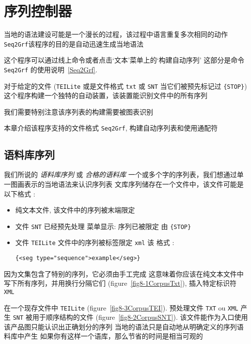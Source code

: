 \chapter{序列控制器}
\label{chap-sequence-automaton}

当地的语法建设可能是一个漫长的过程，该过程中语言重复多次相同的动作 \verb+Seq2Grf+该程序的目的是自动迅速生成当地语法

\bigskip
\noindent
这个程序可以通过线上命令或者点击‘文本’菜单上的‘构建自动序列’
这部分是命令 \verb+Seq2Grf+ 的使用说明~\ref{Seq2Grf}.

\bigskip
\noindent 对于给定的文件 (\verb+TEILite+ 或是文件格式 \verb+txt+ 或 \verb+SNT+ 当它们被预先标记过 \verb+{STOP}+) 这个程序构建一个独特的自动装置，该装置能识别文件中的所有序列

\bigskip
\noindent 我们需要特别注意该序列表的构建需要被图表识别

\bigskip
\noindent 本章介绍该程序支持的文件格式 \verb+Seq2Grf+, 构建自动序列表和使用通配符
\bigskip

\section{语料库序列}
我们所说的 \textit{语料库序列} 或 \textit{合格的语料库}
 一个或多个字的序列表，我们想通过单一图画表示的当地语法来认识序列表
\bigskip
文库序列储存在一个文件中，该文件可能是以下格式 :
\begin{itemize}
\item 纯文本文件, 该文件中的序列被末端限定
\item 文件 \verb+SNT+ 已经预先处理 菜单显示: 序列已被限定
		由 \verb+{STOP}+
\item 文件 \verb+TEILite+ 文件中的序列被标签限定 \verb+xml+ 该
		格式 :

		\verb+{<seg type="sequence">example</seg>}+
\end{itemize}
\pagebreak 
\indent 因为文集包含了特别的序列，它必须由手工完成
这意味着你应该在纯文本文件中写下所有序列，并用换行分隔它们 (figure~\ref{fig8-1CorpusTxt}), 插入特定标识符 \verb+XML+

在一个现存文件中 \verb+TEILite+ (figure~\ref{fig8-3CorpusTEI}). 预处理文件 \verb+TXT+ ou \verb+XML+ 产生 \verb+SNT+ 被用于顺序结构的文件 (figure~\ref{fig8-2CorpusSNT}). 
该文件能作为入口使用
该产品图只能认识出正确划分的序列
当地的语法只是自动地从明确定义的序列语料库中产生
如果你有这样一个语库，那么节省的时间是相当可观的

